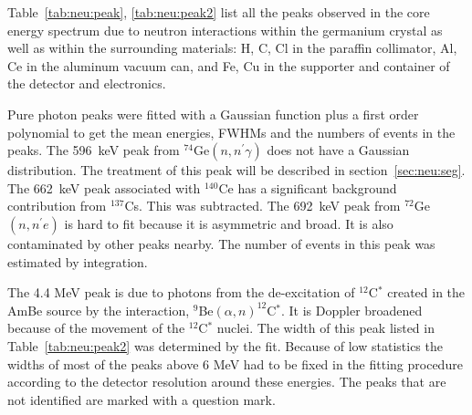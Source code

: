 Table~\ref{tab:neu:peak}, \ref{tab:neu:peak2} list all the peaks observed in the core energy spectrum due to neutron interactions within the germanium crystal as well as within the surrounding materials: H, C, Cl in the paraffin collimator, Al, Ce in the aluminum vacuum can, and Fe, Cu in the supporter and container of the detector and electronics.

Pure photon peaks were fitted with a Gaussian function plus a first order polynomial to get the mean energies, FWHMs and the numbers of events in the peaks. The 596~keV peak from $^{74}$Ge$(n, n^\prime \gamma)$ does not have a Gaussian distribution. The treatment of this peak will be described in section~\ref{sec:neu:seg}. The 662~keV peak associated with $^{140}$Ce has a significant background contribution from $^{137}$Cs. This was subtracted. The 692~keV peak from $^{72}$Ge$(n,n^\prime e)$ is hard to fit because it is asymmetric and broad. It is also contaminated by other peaks nearby. The number of events in this peak was estimated by integration.

The 4.4 MeV peak is due to photons from the de-excitation of $^{12}$C$^{*}$ created in the AmBe source by the interaction, $^{9}$Be$(\alpha,n)^{12}$C$^{*}$. It is Doppler broadened because of the movement of the $^{12}$C$^{*}$ nuclei. The width of this peak listed in Table~\ref{tab:neu:peak2} was determined by the fit. Because of low statistics the widths of most of the peaks above 6 MeV had to be fixed in the fitting procedure according to the detector resolution around these energies. The peaks that are not identified are marked with a question mark.

